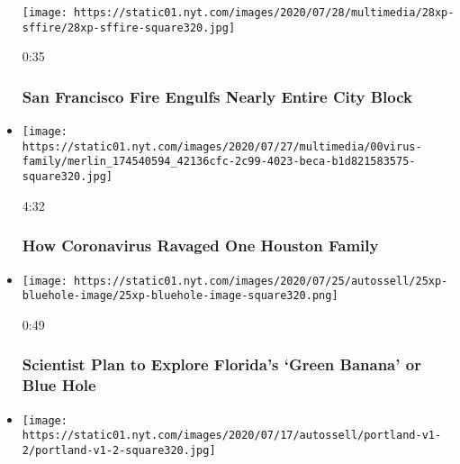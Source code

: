 \begin{itemize}
  \texttt{[image: https://static01.nyt.com/images/2020/07/28/multimedia/28xp-sffire/28xp-sffire-square320.jpg]}

  0:35

  \hypertarget{san-francisco-fire-engulfs-nearly-entire-city-block}{%
  \subsubsection{San Francisco Fire Engulfs Nearly Entire City
  Block}\label{san-francisco-fire-engulfs-nearly-entire-city-block}}
\item
  \href{https://www.nytimes.com/video/us/100000007253343/coronavirus-houston-family.html?action=click\&module=video-series-bar\&region=header\&pgtype=Article\&playlistId=video/u-s}{}

  \texttt{[image: https://static01.nyt.com/images/2020/07/27/multimedia/00virus-family/merlin\_174540594\_42136cfc-2c99-4023-beca-b1d821583575-square320.jpg]}

  4:32

  \hypertarget{how-coronavirus-ravaged-one-houston-family}{%
  \subsubsection{How Coronavirus Ravaged One Houston
  Family}\label{how-coronavirus-ravaged-one-houston-family}}
\item
  \href{https://www.nytimes.com/video/us/100000007255617/florida-green-banana-bluehole.html?action=click\&module=video-series-bar\&region=header\&pgtype=Article\&playlistId=video/u-s}{}

  \texttt{[image: https://static01.nyt.com/images/2020/07/25/autossell/25xp-bluehole-image/25xp-bluehole-image-square320.png]}

  0:49

  \hypertarget{scientist-plan-to-explore-floridas-green-banana-or-blue-hole}{%
  \subsubsection{Scientist Plan to Explore Florida's `Green Banana' or
  Blue
  Hole}\label{scientist-plan-to-explore-floridas-green-banana-or-blue-hole}}
\item
  \href{https://www.nytimes.com/video/us/100000007243995/portland-protests-federal-government.html?action=click\&module=video-series-bar\&region=header\&pgtype=Article\&playlistId=video/u-s}{}

  \texttt{[image: https://static01.nyt.com/images/2020/07/17/autossell/portland-v1-2/portland-v1-2-square320.jpg]}


\end{itemize}
